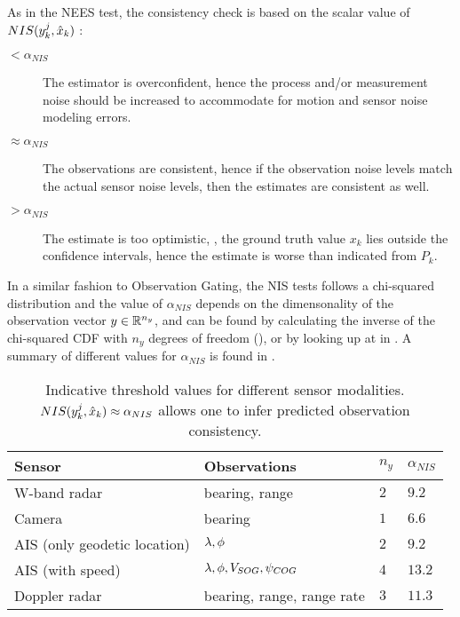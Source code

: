 As in the NEES test, the consistency check is based on the scalar value of $NIS({{y}}^j_k, \hat{x}_k)$ :
\begin{description}
	\item[$< \alpha_{NIS}$] The estimator is overconfident, hence the process and/or measurement noise should be increased to accommodate for motion and sensor noise modeling errors.
	\item[$ \approx \alpha_{NIS} $] The observations are consistent, hence if the observation noise levels match the actual sensor noise levels, then the estimates are consistent as well.
	\item[$> \alpha_{NIS}$] The estimate is too optimistic, \ie, the ground truth value $x_k$ lies outside the confidence intervals, hence the estimate is worse than indicated from $P_k$.
\end{description}
In a similar fashion to Observation Gating, the NIS tests follows a chi-squared distribution and the value of $\alpha_{NIS}$ depends on the dimensonality of the observation vector ${{y}} \in {\mathbb{R}}^{n_y}$, and can be found by calculating the inverse of the chi-squared CDF with $n_y$ degrees of freedom (), or by looking up at  in .  A summary of different values for $\alpha_{NIS}$ is found in .


\begin{table}[H]
	\centering
	\caption{Indicative threshold values for different sensor modalities. $NIS({{y}}^j_k, \hat{x}_k) \approx \alpha_{NIS}$ allows one to infer predicted observation consistency.}
	\label{tab:alphaNIS}
	\begin{tabular}{llll}
		\hline
		Sensor                       & Observations               & $n_y$ & $\alpha_{NIS}$ \\ \hline
		W-band radar                 & bearing, range             & $ 2 $  & $9.2$              \\
		Camera                       & bearing                    & $ 1 $     & $6.6$              \\
		AIS (only geodetic location) & ${\lambda}, {\phi}$                    & $ 2     $ & $ 9.2 $              \\
		AIS (with speed)             & ${\lambda}, {\phi}, {V}_{SOG},{\psi}_{COG}$                  & $ 4  $    & $ 13.2 $       \\
		Doppler radar                & bearing, range, range rate & $ 3  $    & $ 11.3  $             \\ \hline
	\end{tabular}
\end{table}


